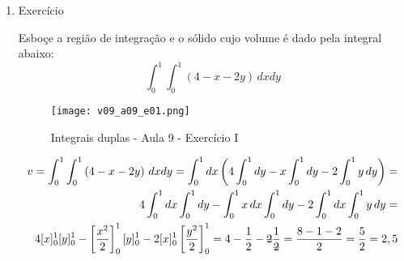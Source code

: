 \begin{enumerate}
	\item Exercício
	
	Esboçe a região de integração e o sólido cujo volume é dado pela integral abaixo:
	\begin{equation*}
		\int_0^1 \int_0^1 \left(4 - x - 2y\right)\, dx dy
	\end{equation*} 
		
	\begin{figure}[htb]
		\caption{Integrais duplas - Aula 9 - Exercício I}
		\label{v09_a09_e01}
		\centering
		\texttt{[image: v09\_a09\_e01.png]}		
	\end{figure}
	
	\begin{align*}
		v = \int_0^1 \int_0^1 \left(4 - x - 2y\right)\, dx dy = \int_0^1 dx \left(4\int_0^1 dy - x\int_0^1 dy - 2\int_0^1 y\, dy\right) =\\ 4\int_0^1 dx \int_0^1 dy - \int_0^1 x\, dx \int_0^1 dy - 2\int_0^1 dx \int_0^1 y\, dy =\\ 4[x]_0^1 [y]_0^1 - \left[\dfrac{x^2}{2}\right]_0^1 [y]_0^1 - 2[x]_0^1 \left[\dfrac{y^2}{2}\right]_0^1 = 4 - \dfrac{1}{2} - \overstrike{2}\dfrac{1}{\overstrike{2}} = \frac{8 - 1 - 2}{2} = \dfrac{5}{2} = 2,5	
	\end{align*}	
\end{enumerate}